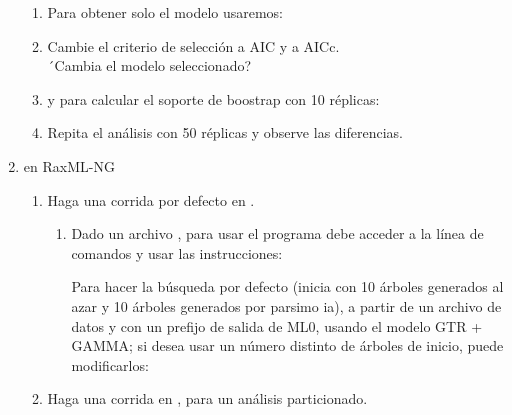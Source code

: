 \begin{enumerate}
\begin{enumerate}
		\item  Para obtener solo el modelo usaremos:\\

		
		\item  Cambie el criterio de selecci\'on a AIC y a AICc.\\
		
		´Cambia el modelo seleccionado?

		
		\item y para calcular el soporte de boostrap con 10 r\'eplicas:\\

		
		\item Repita el análisis con 50 r\'eplicas y observe las diferencias.

		
	\end{enumerate}


  \item{en RaxML-NG}

	\begin{enumerate}
		\item Haga una corrida por defecto en .
		\begin{enumerate}
			\item Dado un archivo , para usar el programa debe acceder a la l\'inea de comandos y usar las instrucciones:

			
			
			
			Para hacer la b\'usqueda por defecto (inicia con 10 
			\'arboles generados al azar y 10 \'arboles generados por 
			parsimo ia), a partir de un archivo de datos  
			 y con un prefijo de salida de ML0, usando 
			el modelo GTR + GAMMA; si desea usar un n\'umero distinto 
			de \'arboles de inicio, puede modificarlos:
			

		\end{enumerate}

		\item Haga una corrida en , para un an\'alisis particionado.




		    \begin{enumerate}
		    

\end{enumerate}
\end{enumerate}
\end{enumerate}
